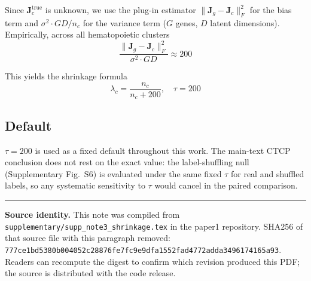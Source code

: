 \documentclass[11pt,a4paper]{article}
\newcommand{\Jmat}{\mathbf{J}}
\begin{document}
Since $\Jmat_c^{\text{true}}$ is unknown, we use the plug-in estimator $\|\Jmat_g - \Jmat_c\|_F^2$ for the bias term and $\sigma^2 \cdot GD / n_c$ for the variance term ($G$ genes, $D$ latent dimensions). Empirically, across all hematopoietic clusters \begin{equation}
\frac{\|\Jmat_g - \Jmat_c\|_F^2}{\sigma^2 \cdot GD} \approx 200
\end{equation}

This yields the shrinkage formula \begin{equation}
\lambda_c = \frac{n_c}{n_c + 200}, \quad \tau = 200
\end{equation}

\subsection*{Default}

$\tau=200$ is used as a fixed default throughout this work. The main-text CTCP conclusion does not rest on the exact value: the label-shuffling null (Supplementary Fig.~S6) is evaluated under the same fixed $\tau$ for real and shuffled labels, so any systematic sensitivity to $\tau$ would cancel in the paired comparison.

\vspace{10pt}
\noindent\rule{\textwidth}{0.4pt}
\footnotesize\textbf{Source identity.} This note was compiled from \texttt{supplementary/supp\_note3\_shrinkage.tex} in the paper1 repository. SHA256 of that source file with this paragraph removed: \texttt{777ce1bd5380b004052c28876fe7fc9e9dfa1552fad4772adda3496174165a93}. Readers can recompute the digest to confirm which revision produced this PDF; the source is distributed with the code release.
\end{document}
